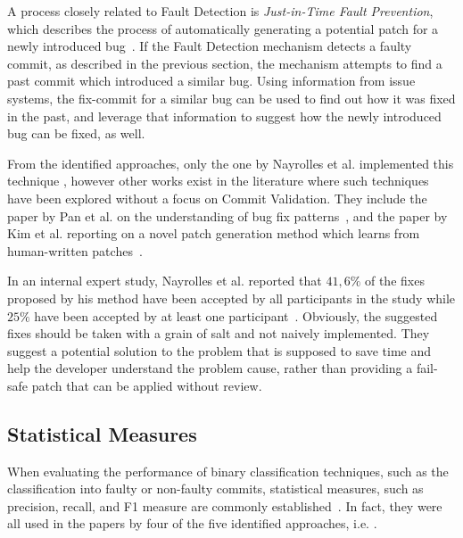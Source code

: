 A process closely related to Fault Detection is \textit{Just-in-Time Fault Prevention}, which describes the process of automatically generating a potential patch for a newly introduced bug~\cite{Nayrolles2018}. If the Fault Detection mechanism detects a faulty commit, as described in the previous section, the mechanism attempts to find a past commit which introduced a similar bug.
Using information from issue systems, the fix-commit for a similar bug can be used to find out how it was fixed in the past, and leverage that information to suggest how the newly introduced bug can be fixed, as well.

From the identified approaches, only the one by Nayrolles et al. implemented this technique \cite{Nayrolles2018}, 
however other works exist
in the literature where such techniques have been explored without a focus on Commit Validation. %
They include the paper by Pan et al. on the understanding of bug fix patterns~\cite{Pan2009}, and the paper by Kim et al. reporting on a novel patch generation method which learns from human-written patches~\cite{Kim2013}.

In an internal expert study, Nayrolles et al. reported that $41,6\%$ of the fixes proposed by his method have been accepted by all participants in the study while $25\%$ have been accepted by at least one participant~\cite{Nayrolles2018}. Obviously, the suggested fixes should be taken with a grain of salt and not naively implemented. They suggest a potential solution to the problem that is supposed to save time and help the developer understand the problem cause, rather than providing a fail-safe patch that can be applied without review.

\subsection{Statistical Measures}
\label{sec:statisticalmeasures}


When evaluating the performance of binary classification techniques, such as the classification into faulty or non-faulty commits, statistical measures, such as precision, recall, and F1 measure are commonly established~\cite{Powers2007}. In fact, they were all used in the papers by four of the five identified approaches,
i.e. \cite{Nayrolles2018, Rosen2015, Yang2015, Kamei2013}.


